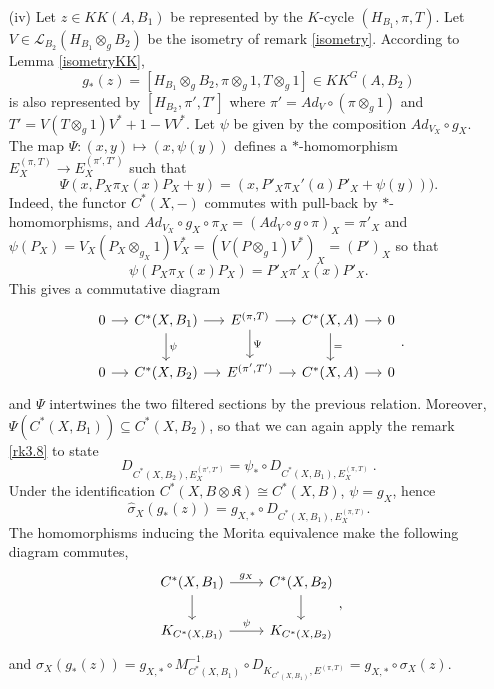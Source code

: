 \begin{dem}
\begin{enumerate}

\item[(iv)]
Let $z \in KK(A,B_1)$ be represented by the $K$-cycle $(H_{B_1},\pi,T)$. Let $V\in \mathcal L_{B_2}(H_{B_1}\otimes_g B_2)$ be the isometry of remark \ref{isometry}. According to Lemma \ref{isometryKK}, 
\[g_*(z)=[H_{B_1}\otimes_g B_2, \pi\otimes_g 1, T\otimes_g 1]\in KK^G(A,B_2)\] 
is also represented by $[H_{B_2}, \pi',T' ]$ where $\pi' = Ad_{V}\circ (\pi\otimes_g 1)$ and $T' = V(T\otimes_g 1)V^* +1-VV^*$. Let $\psi$ be given by the composition $Ad_{V_X}\circ g_X$.\\
The map $\Psi :(x,y)\mapsto (x, \psi(y))$ defines a $*$-homomorphism $E_X^{(\pi,T)} \rightarrow E_X^{(\pi',T')}$ such that 
\[\Psi(x,P_X\pi_X(x)P_X +y)= (x, P'_X  \pi_X'(a)P'_X + \psi(y)) ).\] 
Indeed, the functor $C^*(X,-)$ commutes with pull-back by $*$-homomorphisms, and $Ad_{V_X}\circ g_X\circ\pi_X= (Ad_V\circ g \circ \pi)_X = \pi'_X$ and $\psi(P_X)= V_X (P_X\otimes_{g_X} 1)V^*_X = (V(P\otimes_g 1 ) V^*)_X = (P')_X$ so that 
\[\psi(P_X \pi_X(x) P_X)=P'_X \pi'_X(x) P'_X. \]
This gives a commutative diagram 
\[\begin{tikzcd}[column sep = small]
0\arrow{r} & C^*(X,B_1)\arrow{r}\arrow{d}{\psi} & E^{(\pi,T)} \arrow{r}\arrow{d}{\Psi}& C^*(X,A)\arrow{r}\arrow{d}{=} & 0\\
0\arrow{r} & C^*(X,B_2)\arrow{r} & E^{(\pi',T')} \arrow{r}& C^*(X,A)\arrow{r} & 0
\end{tikzcd}.\]
and $\Psi$ intertwines the two filtered sections by the previous relation. Moreover, $\Psi (C^*(X,B_1))\subseteq C^*(X,B_2)$, so that we can again apply the remark \ref{rk3.8} to state
\[ D_{C^*(X,B_2),E_X^{(\pi',T')}}=\psi_*\circ D_{C^*(X,B_1),E_X^{(\pi,T)}}\ .\]
Under the identification $C^*(X,B\otimes\mathfrak K) \cong C^*(X,B)$, $\psi = g_X$, hence
\[\hat\sigma_X(g_*(z)) = g_{X,*}\circ D_{C^*(X,B_1),E_X^{(\pi,T)}}.\]
The homomorphisms inducing the Morita equivalence make the following diagram commutes,
\[\begin{tikzcd}C^*(X,B_1)\arrow{r}{g_X}\arrow{d} & C^*(X,B_2)\arrow{d} \\ K_{C^*(X,B_1) } \arrow{r}{\psi}& K_{C^*(X,B_2)}\end{tikzcd},\]
and $\sigma_X(g_*(z))= g_{X,*}\circ M_{C^*(X,B_1)}^{-1}\circ D_{K_{C^*(X,B_1)},E^{(\pi,T)}}=g_{X,*}\circ \sigma_X(z)$.\\


\end{enumerate}
\end{dem}
